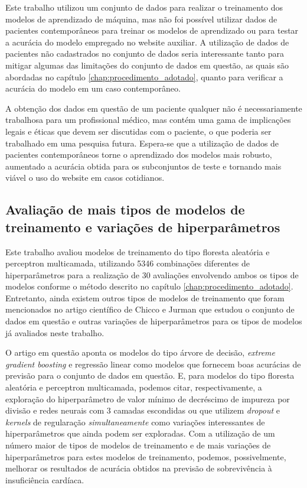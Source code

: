 Este trabalho utilizou um conjunto de dados \cite{larxel_dataset} para realizar o treinamento dos modelos de aprendizado de máquina, mas não foi possível utilizar dados de pacientes contemporâneos para treinar os modelos de aprendizado ou para testar a acurácia do modelo empregado no website auxiliar. A utilização de dados de pacientes não cadastrados no conjunto de dados seria interessante tanto para mitigar algumas das limitações do conjunto de dados em questão, as quais são abordadas no capítulo \ref{chap:procedimento_adotado}, quanto para verificar a acurácia do modelo em um caso contemporâneo.

A obtenção dos dados em questão de um paciente qualquer não é necessariamente trabalhosa para um profissional médico, mas contém uma gama de implicações legais e éticas que devem ser discutidas com o paciente, o que poderia ser trabalhado em uma pesquisa futura. Espera-se que a utilização de dados de pacientes contemporâneos torne o aprendizado dos modelos mais robusto, aumentado a acurácia obtida para os subconjuntos de teste e tornando mais viável o uso do website em casos cotidianos.

\subsection{Avaliação de mais tipos de modelos de treinamento e variações de hiperparâmetros}

Este trabalho avaliou modelos de treinamento do tipo floresta aleatória e perceptron multicamada, utilizando 5346 combinações diferentes de hiperparâmetros para a realização de 30 avaliações envolvendo ambos os tipos de modelos conforme o método descrito no capítulo \ref{chap:procedimento_adotado}. Entretanto, ainda existem outros tipos de modelos de treinamento que foram mencionados no artigo científico de Chicco e Jurman \cite{chicco2020} que estudou o conjunto de dados em questão e outras variações de hiperparâmetros para os tipos de modelos já avaliados neste trabalho.

O artigo em questão aponta os modelos do tipo árvore de decisão, \textit{extreme gradient boosting} e regressão linear como modelos que fornecem boas acurácias de previsão para o conjunto de dados em questão. E, para modelos do tipo floresta aleatória e perceptron multicamada, podemos citar, respectivamente, a exploração do hiperparâmetro de valor mínimo de decréscimo de impureza por divisão e redes neurais com 3 camadas escondidas ou que utilizem \textit{dropout} e \textit{kernels} de regularação \textit{simultaneamente} como variações interessantes de hiperparâmetros que ainda podem ser exploradas. Com a utilização de um número maior de tipos de modelos de treinamento e de mais variações de hiperparâmetros para estes modelos de treinamento, podemos, possivelmente, melhorar os resultados de acurácia obtidos na previsão de sobrevivência à insuficiência cardíaca.

